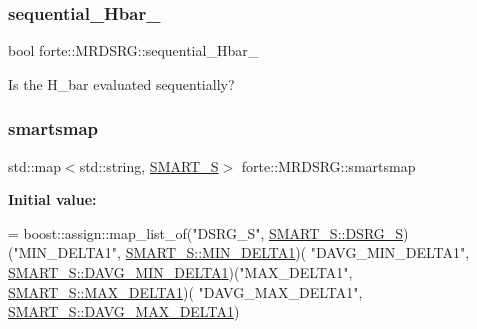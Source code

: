 \subsubsection{\texorpdfstring{sequential\+\_\+\+Hbar\+\_\+}{sequential\_Hbar\_}}
{\footnotesize\ttfamily bool forte\+::\+M\+R\+D\+S\+R\+G\+::sequential\+\_\+\+Hbar\+\_\+\hspace{0.3cm}{\ttfamily [protected]}}



Is the H\+\_\+bar evaluated sequentially? 

\mbox{\label{classforte_1_1_m_r_d_s_r_g_a596c3d64a33a55bc52397468144e2833}} 
\subsubsection{\texorpdfstring{smartsmap}{smartsmap}}
{\footnotesize\ttfamily std\+::map$<$std\+::string, \mbox{\hyperlink{classforte_1_1_m_r_d_s_r_g_ae11de126949a51f3c7f7978e3802cf1a}{S\+M\+A\+R\+T\+\_\+S}}$>$ forte\+::\+M\+R\+D\+S\+R\+G\+::smartsmap\hspace{0.3cm}{\ttfamily [protected]}}

{\bfseries Initial value\+:}
\begin{DoxyCode}
=
        boost::assign::map\_list\_of(\textcolor{stringliteral}{"DSRG\_S"}, \mbox{\hyperlink{classforte_1_1_m_r_d_s_r_g_ae11de126949a51f3c7f7978e3802cf1aa46337bd07f591d5b0b721e66082f734b}{SMART\_S::DSRG\_S}})(\textcolor{stringliteral}{"MIN\_DELTA1"}, 
      \mbox{\hyperlink{classforte_1_1_m_r_d_s_r_g_ae11de126949a51f3c7f7978e3802cf1aaf3b604b3a30e9749835c3af670ccb2e8}{SMART\_S::MIN\_DELTA1}})(
            \textcolor{stringliteral}{"DAVG\_MIN\_DELTA1"}, \mbox{\hyperlink{classforte_1_1_m_r_d_s_r_g_ae11de126949a51f3c7f7978e3802cf1aa474437f916a2f1e6a65df0b30c7ba2fe}{SMART\_S::DAVG\_MIN\_DELTA1}})(\textcolor{stringliteral}{"MAX\_DELTA1"}, 
      \mbox{\hyperlink{classforte_1_1_m_r_d_s_r_g_ae11de126949a51f3c7f7978e3802cf1aacac61ebde203ec61fa196b4d28cc326f}{SMART\_S::MAX\_DELTA1}})(
            \textcolor{stringliteral}{"DAVG\_MAX\_DELTA1"}, \mbox{\hyperlink{classforte_1_1_m_r_d_s_r_g_ae11de126949a51f3c7f7978e3802cf1aa2c412ab776614964ecaef4b1aaa8f71f}{SMART\_S::DAVG\_MAX\_DELTA1}})
\end{DoxyCode}
\mbox{\label{classforte_1_1_m_r_d_s_r_g_a20ea6ec4ce84343df8db050a11db8534}} 
